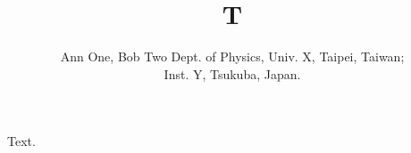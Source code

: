\documentclass{spie}
\title{T}
\author{Ann One\supit{a,b}, Bob Two\supit{b}
\skiplinehalf
\supit{a}Dept. of Physics, Univ. X, Taipei, Taiwan; \\
\supit{b}Inst. Y, Tsukuba, Japan.}
\begin{document}
\maketitle
Text.
\end{document}
